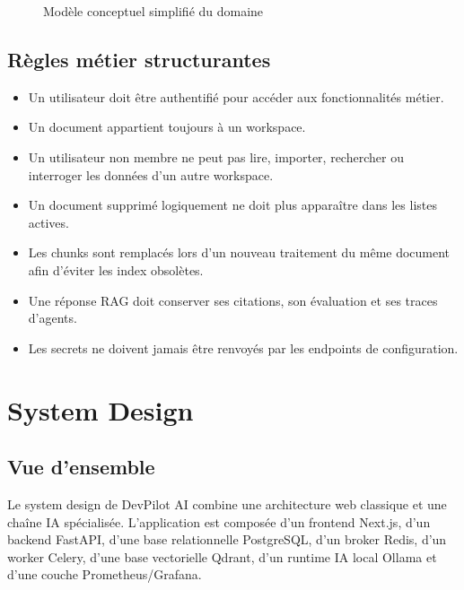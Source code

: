 \documentclass[12pt,a4paper,oneside]{report}
\begin{document}
\begin{figure}[H]
{}
  \caption{Modèle conceptuel simplifié du domaine}
\end{figure}

\section{Règles métier structurantes}
\begin{itemize}
  \item Un utilisateur doit être authentifié pour accéder aux fonctionnalités métier.
  \item Un document appartient toujours à un workspace.
  \item Un utilisateur non membre ne peut pas lire, importer, rechercher ou interroger les données d'un autre workspace.
  \item Un document supprimé logiquement ne doit plus apparaître dans les listes actives.
  \item Les chunks sont remplacés lors d'un nouveau traitement du même document afin d'éviter les index obsolètes.
  \item Une réponse RAG doit conserver ses citations, son évaluation et ses traces d'agents.
  \item Les secrets ne doivent jamais être renvoyés par les endpoints de configuration.
\end{itemize}

\chapter{System Design}

\section{Vue d'ensemble}
Le system design de DevPilot AI combine une architecture web classique et une chaîne IA spécialisée. L'application est composée d'un frontend Next.js, d'un backend FastAPI, d'une base relationnelle PostgreSQL, d'un broker Redis, d'un worker Celery, d'une base vectorielle Qdrant, d'un runtime IA local Ollama et d'une couche Prometheus/Grafana.
\end{document}
